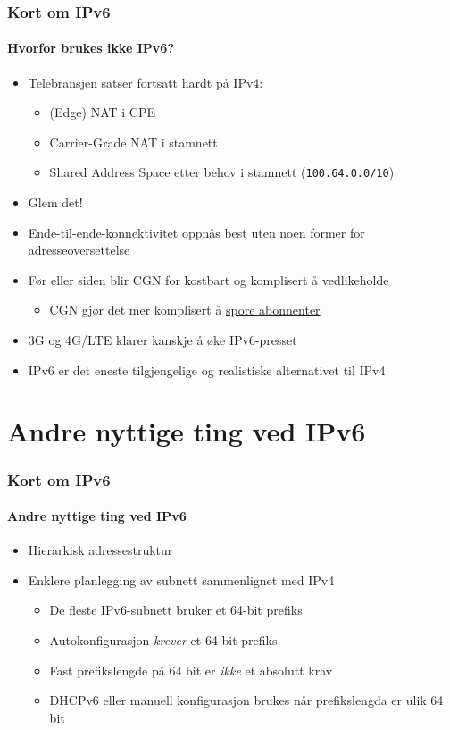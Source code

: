 \begin{frame}%
  \frametitle{Kort om IPv6}
  \framesubtitle{Hvorfor brukes ikke IPv6?}
  \begin{itemize}[<+->]
  \item Telebransjen satser fortsatt hardt på IPv4:
    \begin{itemize}[<+->]
    \item (Edge) NAT i CPE\hfill{}
    \item Carrier-Grade NAT i stamnett\hfill{}
    \item Shared Address Space etter behov i stamnett (\texttt{100.64.0.0/10})\hfill{}
    \end{itemize}
  \item Glem det!
  \item Ende-til-ende-konnektivitet oppnås best uten noen former for
    adresseoversettelse
  \item Før eller siden blir CGN for kostbart og komplisert å vedlikeholde
    \begin{itemize}[<+->]
    \item CGN gjør det mer komplisert å
      \href{http://www.nyteknik.se/nyheter/it_telekom/allmant/article3904264.ece}{spore
        abonnenter}
    \end{itemize}
  \item 3G og 4G/LTE klarer kanskje å øke IPv6-presset\hfill{}
  \item \alert<8>{IPv6 er det eneste tilgjengelige og realistiske alternativet til IPv4}
  \end{itemize}
\end{frame}

\section{Andre nyttige ting ved IPv6}
\begin{frame}%
  \frametitle{Kort om IPv6}
  \framesubtitle{Andre nyttige ting ved IPv6}
  \pause
  \begin{itemize}[<+->]
  \item Hierarkisk adressestruktur
  \item Enklere planlegging av subnett sammenlignet med IPv4
    \begin{itemize}[<+->]
    \item De fleste IPv6-subnett bruker et 64-bit prefiks
    \item Autokonfigurasjon \textit{krever\/} et 64-bit prefiks
    \item Fast prefikslengde på 64 bit er \textit{ikke\/} et absolutt
      krav
    \item DHCPv6 eller manuell konfigurasjon brukes når prefikslengda
      er ulik 64 bit
    \end{itemize}
  \end{itemize}
\end{frame}

